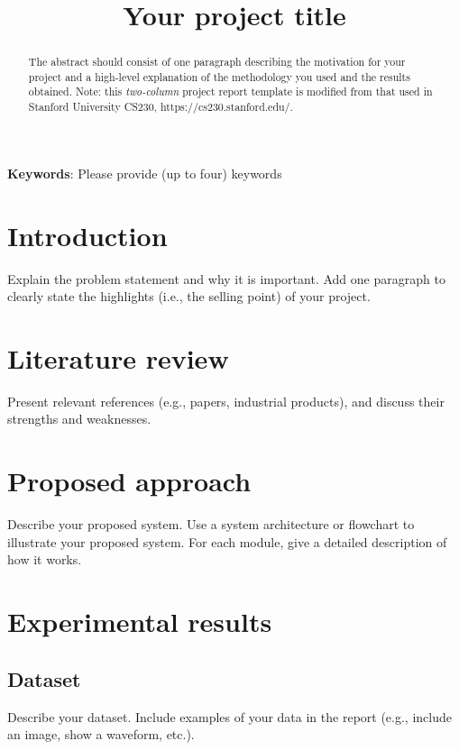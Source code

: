 \documentclass{article}
\title{Your project title}
\begin{document}
%
\maketitle
%

\begin{abstract}

The abstract should consist of one paragraph describing the motivation for your project and a high-level explanation of the methodology you used and the results obtained. Note: this \textit{two-column} project report template is modified from that used in Stanford University CS230, https://cs230.stanford.edu/. 

\end{abstract}
%

\textbf{Keywords}: Please provide (up to four) keywords

\section{Introduction}
\label{sec:intro}

Explain the problem statement and why it is important. Add one paragraph to clearly state the highlights (i.e., the selling point) of your project.

\section{Literature review}
Present relevant references (e.g., papers, industrial products), and discuss their strengths and weaknesses.

\section{Proposed approach}
Describe your proposed system. Use a system architecture or flowchart to illustrate your proposed system. For each module, give a detailed description of how it works.

\section{Experimental results}

\subsection{Dataset}
Describe your dataset. Include examples of your data in the report (e.g., include an image, show a waveform, etc.).
\end{document}

